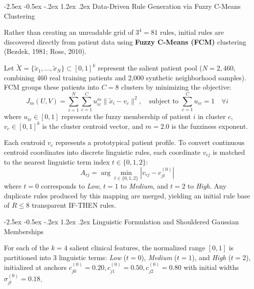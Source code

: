 \documentclass[12pt,a4paper,oneside]{report}
\makeatletter
\renewcommand\section{\@startsection {section}{1}{\z@}%
                                   {-2.5ex \@plus -0.5ex \@minus -.2ex}%
                                   {1.2ex \@plus .2ex}%
                                   {\normalfont\fontsize{13}{16}\selectfont\bfseries}}
\makeatother
\begin{document}
\section{Data-Driven Rule Generation via Fuzzy C-Means Clustering}

Rather than creating an unreadable grid of $3^4 = 81$ rules, initial rules are discovered directly from patient data using \textbf{Fuzzy C-Means (FCM)} clustering (Bezdek, 1981; Ross, 2010).

Let $\tilde{X} = \{\tilde{x}_1, \dots, \tilde{x}_N\} \subset [0, 1]^k$ represent the salient patient pool ($N = 2{,}460$, combining 460 real training patients and 2,000 synthetic neighborhood samples). FCM groups these patients into $C = 8$ clusters by minimizing the objective:
\begin{equation}
    J_m(U, V) = \sum_{i=1}^N \sum_{c=1}^C u_{ic}^m \|\tilde{x}_i - v_c\|^2, \quad \text{subject to } \sum_{c=1}^C u_{ic} = 1 \quad \forall i
\end{equation}
where $u_{ic} \in [0, 1]$ represents the fuzzy membership of patient $i$ in cluster $c$, $v_c \in [0, 1]^k$ is the cluster centroid vector, and $m = 2.0$ is the fuzziness exponent.

Each centroid $v_c$ represents a prototypical patient profile. To convert continuous centroid coordinates into discrete linguistic rules, each coordinate $v_{cj}$ is matched to the nearest linguistic term index $t \in \{0, 1, 2\}$:
\begin{equation}
    A_{rj} = \arg\min_{t \in \{0, 1, 2\}} |v_{rj} - c_{jt}^{(0)}|
\end{equation}
where $t=0$ corresponds to \textit{Low}, $t=1$ to \textit{Medium}, and $t=2$ to \textit{High}. Any duplicate rules produced by this mapping are merged, yielding an initial rule base of $R \le 8$ transparent IF-THEN rules.

\section{Linguistic Formulation and Shouldered Gaussian Memberships}

For each of the $k=4$ salient clinical features, the normalized range $[0, 1]$ is partitioned into 3 linguistic terms: \textit{Low} ($t=0$), \textit{Medium} ($t=1$), and \textit{High} ($t=2$), initialized at anchors $c_{j0}^{(0)} = 0.20, c_{j1}^{(0)} = 0.50, c_{j2}^{(0)} = 0.80$ with initial widths $\sigma_{jt}^{(0)} = 0.18$.
\end{document}
